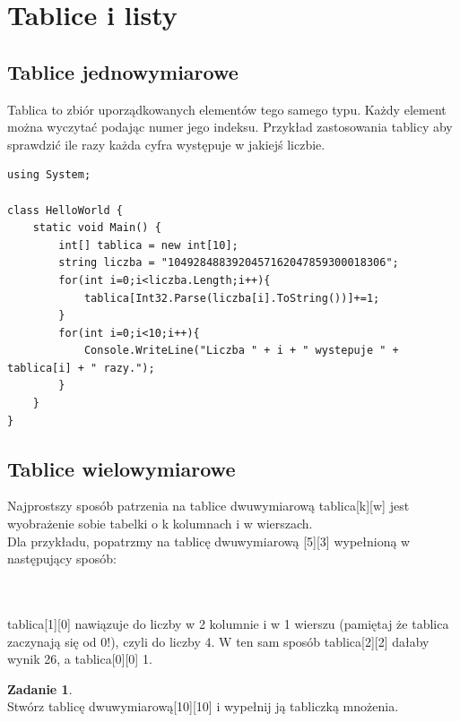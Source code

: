 \documentclass[a4paper]{article}
\theoremstyle{definition}
\newtheorem{zadanie}[theorem]{Zadanie}
\begin{document}
\section{Tablice i listy}
\subsection{Tablice jednowymiarowe}
Tablica to zbiór uporządkowanych elementów tego samego typu. Każdy element można wyczytać podając numer jego indeksu. Przykład zastosowania tablicy aby sprawdzić ile razy każda cyfra występuje w jakiejś liczbie.\\
\begin{lstlisting}[frame=single]
using System;

class HelloWorld {
    static void Main() {
    	int[] tablica = new int[10];
        string liczba = "1049284883920457162047859300018306";
        for(int i=0;i<liczba.Length;i++){
        	tablica[Int32.Parse(liczba[i].ToString())]+=1;
        }
        for(int i=0;i<10;i++){
        	Console.WriteLine("Liczba " + i + " wystepuje " + tablica[i] + " razy.");
        }
    }
}

\end{lstlisting}
\subsection{Tablice wielowymiarowe}
Najprostszy sposób patrzenia na tablice dwuwymiarową tablica[k][w] jest wyobrażenie sobie tabelki o k kolumnach i w wierszach.\\
Dla przykładu, popatrzmy na tablicę dwuwymiarową [5][3] wypełnioną w następujący sposób:
\\\\
\\
tablica[1][0] nawiązuje do liczby w 2 kolumnie i w 1 wierszu (pamiętaj że tablica zaczynają się od 0!), czyli do liczby 4. W ten sam sposób tablica[2][2] dałaby wynik 26, a tablica[0][0] 1.
\begin{zadanie}
\\Stwórz tablicę dwuwymiarową[10][10] i wypełnij ją tabliczką mnożenia.
\end{zadanie}
\end{document}
